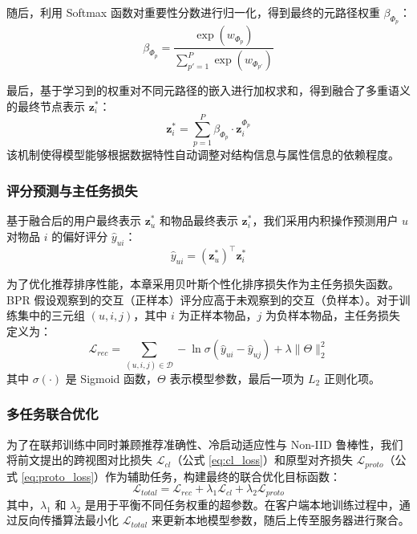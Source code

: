 随后，利用 Softmax 函数对重要性分数进行归一化，得到最终的元路径权重 $\beta_{\Phi_p}$：
\begin{equation}
    \beta_{\Phi_p} = \frac{\exp(w_{\Phi_p})}{\sum_{p'=1}^P \exp(w_{\Phi_{p'}})}
\end{equation}

最后，基于学习到的权重对不同元路径的嵌入进行加权求和，得到融合了多重语义的最终节点表示 $\mathbf{z}_i^*$：
\begin{equation}
    \mathbf{z}_i^* = \sum_{p=1}^P \beta_{\Phi_p} \cdot \mathbf{z}_i^{\Phi_p}
\end{equation}
该机制使得模型能够根据数据特性自动调整对结构信息与属性信息的依赖程度。

\subsubsection{评分预测与主任务损失}
基于融合后的用户最终表示 $\mathbf{z}_u^*$ 和物品最终表示 $\mathbf{z}_i^*$，我们采用内积操作预测用户 $u$ 对物品 $i$ 的偏好评分 $\hat{y}_{ui}$：
\begin{equation}
    \hat{y}_{ui} = (\mathbf{z}_u^*)^\top \mathbf{z}_i^*
\end{equation}

为了优化推荐排序性能，本章采用贝叶斯个性化排序损失作为主任务损失函数。BPR 假设观察到的交互（正样本）评分应高于未观察到的交互（负样本）。对于训练集中的三元组 $(u, i, j)$，其中 $i$ 为正样本物品，$j$ 为负样本物品，主任务损失定义为：
\begin{equation}
    \mathcal{L}_{rec} = \sum_{(u,i,j) \in \mathcal{D}} - \ln \sigma(\hat{y}_{ui} - \hat{y}_{uj}) + \lambda \|\Theta\|_2^2
\end{equation}
其中 $\sigma(\cdot)$ 是 Sigmoid 函数，$\Theta$ 表示模型参数，最后一项为 $L_2$ 正则化项。

\subsubsection{多任务联合优化}
为了在联邦训练中同时兼顾推荐准确性、冷启动适应性与 Non-IID 鲁棒性，我们将前文提出的跨视图对比损失 $\mathcal{L}_{cl}$（公式 \ref{eq:cl_loss}）和原型对齐损失 $\mathcal{L}_{proto}$（公式 \ref{eq:proto_loss}）作为辅助任务，构建最终的联合优化目标函数：
\begin{equation}
    \mathcal{L}_{total} = \mathcal{L}_{rec} + \lambda_1 \mathcal{L}_{cl} + \lambda_2 \mathcal{L}_{proto}
\end{equation}
其中，$\lambda_1$ 和 $\lambda_2$ 是用于平衡不同任务权重的超参数。在客户端本地训练过程中，通过反向传播算法最小化 $\mathcal{L}_{total}$ 来更新本地模型参数，随后上传至服务器进行聚合。

